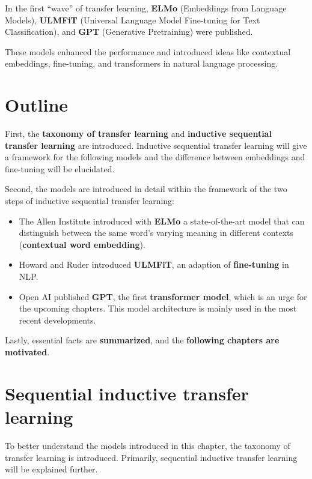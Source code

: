 \documentclass[]{krantz}
\begin{document}
In the first ``wave'' of transfer learning, \textbf{ELMo} (Embeddings from Language Models), \textbf{ULMFiT} (Universal Language Model Fine-tuning for Text Classification), and \textbf{GPT} (Generative Pretraining) were published.

These models enhanced the performance and introduced ideas like contextual embeddings, fine-tuning, and transformers in natural language processing.

\hypertarget{outline}{%
\section{Outline}\label{outline}}

First, the \textbf{taxonomy of transfer learning} and \textbf{inductive sequential transfer learning} are introduced. Inductive sequential transfer learning will give a framework for the following models and the difference between embeddings and fine-tuning will be elucidated.

Second, the models are introduced in detail within the framework of the two steps of inductive sequential transfer learning:

\begin{itemize}
\item
  The Allen Institute introduced with \textbf{ELMo} a state-of-the-art model that can distinguish between the same word's varying meaning in different contexts (\textbf{contextual word embedding}).
\item
  Howard and Ruder introduced \textbf{ULMFiT}, an adaption of \textbf{fine-tuning} in NLP.
\item
  Open AI published \textbf{GPT}, the first \textbf{transformer model}, which is an urge for the upcoming chapters. This model architecture is mainly used in the most recent developments.
\end{itemize}

Lastly, essential facts are \textbf{summarized}, and the \textbf{following chapters are motivated}.

\hypertarget{sequential-inductive-transfer-learning}{%
\section{Sequential inductive transfer learning}\label{sequential-inductive-transfer-learning}}

To better understand the models introduced in this chapter, the taxonomy of transfer learning is introduced. Primarily, sequential inductive transfer learning will be explained further.
\end{document}
